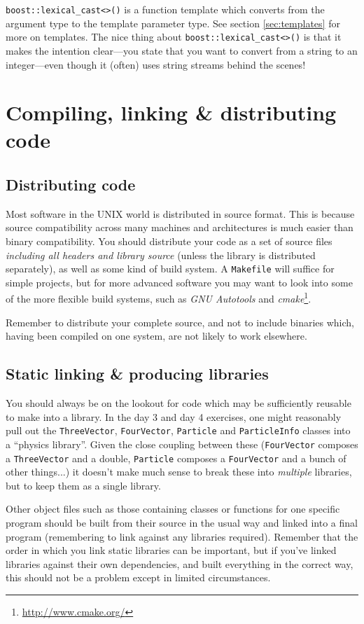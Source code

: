 \documentclass[a4paper]{scrartcl}
\begin{document}
\verb|boost::lexical_cast<>()| is a function template which converts from the argument type to the template parameter type. See section \ref{sec:templates} for more on templates. The nice thing about \verb|boost::lexical_cast<>()| is that it makes the intention clear---you state that you want to convert from a string to an integer---even though it (often) uses string streams behind the scenes!

\section{Compiling, linking \& distributing code}\label{sec:compiling}
\subsection{Distributing code}
Most software in the UNIX world is distributed in source format. This is because source compatibility across many machines and architectures is much easier than binary compatibility. You should distribute your code as a set of source files \emph{including all headers and library source} (unless the library is distributed separately), as well as some kind of build system. A \verb|Makefile| will suffice for simple projects, but for more advanced software you may want to look into some of the more flexible build systems, such as \emph{GNU Autotools}\cite{Autobook} and \emph{cmake}\footnote{\url{http://www.cmake.org/}}.

Remember to distribute your complete source, and not to include binaries which, having been compiled on one system, are not likely to work elsewhere.

\subsection{Static linking \& producing libraries}
You should always be on the lookout for code which may be sufficiently reusable to make into a library. In the day 3 and day 4 exercises, one might reasonably pull out the \verb|ThreeVector|, \verb|FourVector|, \verb|Particle| and \verb|ParticleInfo| classes into a ``physics library''. Given the close coupling between these (\verb|FourVector| composes a \verb|ThreeVector| and a double, \verb|Particle| composes a \verb|FourVector| and a bunch of other things...) it doesn't make much sense to break these into \emph{multiple} libraries, but to keep them as a single library.

Other object files such as those containing classes or functions for one specific program should be built from their source in the usual way and linked into a final program (remembering to link against any libraries required). Remember that the order in which you link static libraries can be important, but if you've linked libraries against their own dependencies, and built everything in the correct way, this should not be a problem except in limited circumstances.
\end{document}
